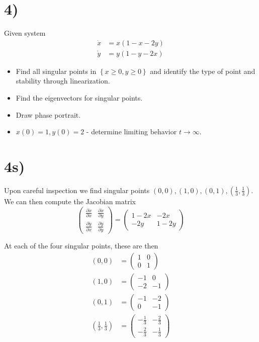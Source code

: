 \documentclass[10pt,twocolumn]{article}
\newcommand{\pd}[2]{\frac{\partial #1}{\partial#2}}
\begin{document}
\section*{4)}

Given system
\begin{align*}
    \dot{x} &= x(1-x-2y)\\
    \dot{y} &= y(1-y-2x)
\end{align*}

\begin{itemize}
    \item Find all singular points in $\left\{ x \geq 0, y \geq 0 \right\}$ and identify the type of point and stability through linearization.
    \item Find the eigenvectors for singular points.
    \item Draw phase portrait.
    \item $x(0) = 1, y(0) = 2$ - determine limiting behavior $t \to \infty$.
\end{itemize}

\section*{4s)}

Upon careful inspection we find singular points $(0,0), (1,0), (0,1), \left( \frac{1}{3}, \frac{1}{3} \right)$. We can then compute the Jacobian matrix
$$\begin{pmatrix} \pd{\dot{x}}{x} & \pd{\dot{x}}{y}\\ \pd{\dot{y}}{x} & \pd{\dot{y}}{y} \end{pmatrix}  = \begin{pmatrix} 1-2x & -2x \\ -2y & 1-2y \end{pmatrix}$$

At each of the four singular points, these are then
\begin{align*}
    (0,0) &= \begin{pmatrix} 1&0\\0&1 \end{pmatrix}\\
    (1,0) &= \begin{pmatrix} -1&0\\-2&-1 \end{pmatrix} \\
    (0,1) &= \begin{pmatrix} -1&-2\\0&-1 \end{pmatrix} \\
    \left( \frac{1}{3}, \frac{1}{3} \right) &= \begin{pmatrix} -\frac{1}{3} & -\frac{2}{3}\\-\frac{2}{3}&-\frac{1}{3} \end{pmatrix}
\end{align*}
\end{document}
